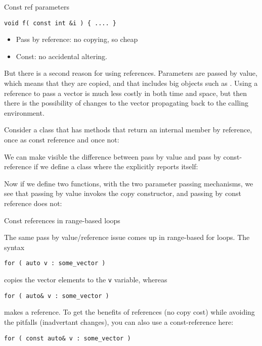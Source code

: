 \begin{slide}{Const ref parameters}
  \label{sl:const-ref}
\begin{lstlisting}
void f( const int &i ) { .... }
\end{lstlisting}
\begin{itemize}
\item Pass by reference: no copying, so cheap
\item Const: no accidental altering.
\end{itemize}

\end{slide}

But there is a second reason for using references. Parameters are
passed by value, which means that they are copied, and that includes
big objects such as . Using a reference to pass a
vector is much less costly in both time and space, but then there is the
possibility of changes to the vector propagating back to the calling
environment.

Consider a class that has methods that return an internal member by
reference, once as const reference and once not:
%

We can make visible the difference between pass by value and pass by
const-reference if we define a class where the
 explicitly reports itself:
%
  
Now if we define two functions, with the two parameter passing
mechanisms, we see that passing by value invokes the copy constructor,
and passing by const reference does not:
%

 {Const references in range-based loops}

The same pass by value/reference issue comes up in range-based for
loops. The syntax
\begin{lstlisting}
for ( auto v : some_vector )
\end{lstlisting}
copies the vector elements to the \lstinline{v} variable, whereas
\begin{lstlisting}
for ( auto& v : some_vector )
\end{lstlisting}
makes a reference. To get the benefits of references (no copy cost)
while avoiding the pitfalls (inadvertant changes), you can also use a
const-reference here:
\begin{lstlisting}
for ( const auto& v : some_vector )
\end{lstlisting}


